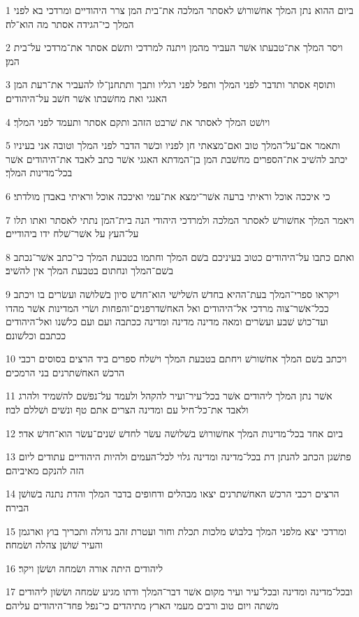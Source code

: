 \par 1 ביום ההוא נתן המלך אחשׁורושׁ לאסתר המלכה את־בית המן צרר היהודיים ומרדכי בא לפני המלך כי־הגידה אסתר מה הוא־לה׃
\par 2 ויסר המלך את־טבעתו אשׁר העביר מהמן ויתנה למרדכי ותשׂם אסתר את־מרדכי על־בית המן׃
\par 3 ותוסף אסתר ותדבר לפני המלך ותפל לפני רגליו ותבך ותתחנן־לו להעביר את־רעת המן האגגי ואת מחשׁבתו אשׁר חשׁב על־היהודים׃
\par 4 ויושׁט המלך לאסתר את שׁרבט הזהב ותקם אסתר ותעמד לפני המלך׃
\par 5 ותאמר אם־על־המלך טוב ואם־מצאתי חן לפניו וכשׁר הדבר לפני המלך וטובה אני בעיניו יכתב להשׁיב את־הספרים מחשׁבת המן בן־המדתא האגגי אשׁר כתב לאבד את־היהודים אשׁר בכל־מדינות המלך׃
\par 6 כי איככה אוכל וראיתי ברעה אשׁר־ימצא את־עמי ואיככה אוכל וראיתי באבדן מולדתי׃
\par 7 ויאמר המלך אחשׁורשׁ לאסתר המלכה ולמרדכי היהודי הנה בית־המן נתתי לאסתר ואתו תלו על־העץ על אשׁר־שׁלח ידו ביהודיים׃
\par 8 ואתם כתבו על־היהודים כטוב בעיניכם בשׁם המלך וחתמו בטבעת המלך כי־כתב אשׁר־נכתב בשׁם־המלך ונחתום בטבעת המלך אין להשׁיב׃
\par 9 ויקראו ספרי־המלך בעת־ההיא בחדשׁ השׁלישׁי הוא־חדשׁ סיון בשׁלושׁה ועשׂרים בו ויכתב ככל־אשׁר־צוה מרדכי אל־היהודים ואל האחשׁדרפנים־והפחות ושׂרי המדינות אשׁר מהדו ועד־כושׁ שׁבע ועשׂרים ומאה מדינה מדינה ומדינה ככתבה ועם ועם כלשׁנו ואל־היהודים ככתבם וכלשׁונם׃
\par 10 ויכתב בשׁם המלך אחשׁורשׁ ויחתם בטבעת המלך וישׁלח ספרים ביד הרצים בסוסים רכבי הרכשׁ האחשׁתרנים בני הרמכים׃
\par 11 אשׁר נתן המלך ליהודים אשׁר בכל־עיר־ועיר להקהל ולעמד על־נפשׁם להשׁמיד ולהרג ולאבד את־כל־חיל עם ומדינה הצרים אתם טף ונשׁים ושׁללם לבוז׃
\par 12 ביום אחד בכל־מדינות המלך אחשׁורושׁ בשׁלושׁה עשׂר לחדשׁ שׁנים־עשׂר הוא־חדשׁ אדר׃
\par 13 פתשׁגן הכתב להנתן דת בכל־מדינה ומדינה גלוי לכל־העמים ולהיות היהודיים עתודים ליום הזה להנקם מאיביהם׃
\par 14 הרצים רכבי הרכשׁ האחשׁתרנים יצאו מבהלים ודחופים בדבר המלך והדת נתנה בשׁושׁן הבירה׃
\par 15 ומרדכי יצא מלפני המלך בלבושׁ מלכות תכלת וחור ועטרת זהב גדולה ותכריך בוץ וארגמן והעיר שׁושׁן צהלה ושׂמחה׃
\par 16 ליהודים היתה אורה ושׂמחה ושׂשׂן ויקר׃
\par 17 ובכל־מדינה ומדינה ובכל־עיר ועיר מקום אשׁר דבר־המלך ודתו מגיע שׂמחה ושׂשׂון ליהודים משׁתה ויום טוב ורבים מעמי הארץ מתיהדים כי־נפל פחד־היהודים עליהם׃

